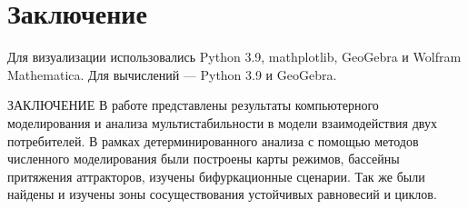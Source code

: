 \section{Заключение}



    Для визуализации использовались Python 3.9, mathplotlib, GeoGebra и Wolfram Mathematica. Для вычислений --- Python 3.9 и GeoGebra.

    ЗАКЛЮЧЕНИЕ 
В работе представлены результаты компьютерного моделирования и анализа мультистабильности в модели взаимодействия двух потребителей. 
В рамках детерминированного анализа с помощью методов численного моделирования были построены карты режимов, бассейны притяжения аттракторов, изучены бифуркационные сценарии. Так же были найдены и изучены зоны сосуществования устойчивых равновесий и циклов.

